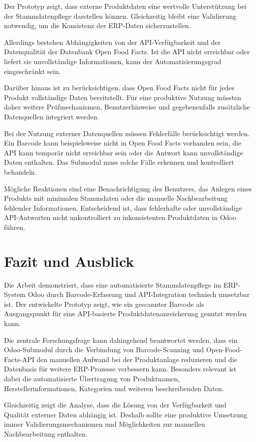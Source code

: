 \documentclass[12pt,a4paper]{article}
\begin{document}
Der Prototyp zeigt, dass externe Produktdaten eine wertvolle Unterstützung bei der Stammdatenpflege darstellen können. Gleichzeitig bleibt eine Validierung notwendig, um die Konsistenz der ERP-Daten sicherzustellen.

Allerdings bestehen Abhängigkeiten von der API-Verfügbarkeit und der Datenqualität der Datenbank Open Food Facts. Ist die API nicht erreichbar oder liefert sie unvollständige Informationen, kann der Automatisierungsgrad eingeschränkt sein.

Darüber hinaus ist zu berücksichtigen, dass Open Food Facts nicht für jedes Produkt vollständige Daten bereitstellt. Für eine produktive Nutzung müssten daher weitere Prüfmechanismen, Benutzerhinweise und gegebenenfalls zusätzliche Datenquellen integriert werden.

Bei der Nutzung externer Datenquellen müssen Fehlerfälle berücksichtigt werden. Ein Barcode kann beispielsweise nicht in Open Food Facts vorhanden sein, die API kann temporär nicht erreichbar sein oder die Antwort kann unvollständige Daten enthalten. Das Submodul muss solche Fälle erkennen und kontrolliert behandeln.

Mögliche Reaktionen sind eine Benachrichtigung des Benutzers, das Anlegen eines Produkts mit minimalen Stammdaten oder die manuelle Nachbearbeitung fehlender Informationen. Entscheidend ist, dass fehlerhafte oder unvollständige API-Antworten nicht unkontrolliert zu inkonsistenten Produktdaten in Odoo führen.

\section{Fazit und Ausblick}

Die Arbeit demonstriert, dass eine automatisierte Stammdatenpflege im ERP-System Odoo durch Barcode-Erfassung und API-Integration technisch umsetzbar ist. Der entwickelte Prototyp zeigt, wie ein gescannter Barcode als Ausgangspunkt für eine API-basierte Produktdatenanreicherung genutzt werden kann.

Die zentrale Forschungsfrage kann dahingehend beantwortet werden, dass ein Odoo-Submodul durch die Verbindung von Barcode-Scanning und Open-Food-Facts-API den manuellen Aufwand bei der Produktanlage reduzieren und die Datenbasis für weitere ERP-Prozesse verbessern kann. Besonders relevant ist dabei die automatisierte Übertragung von Produktnamen, Herstellerinformationen, Kategorien und weiteren beschreibenden Daten.

Gleichzeitig zeigt die Analyse, dass die Lösung von der Verfügbarkeit und Qualität externer Daten abhängig ist. Deshalb sollte eine produktive Umsetzung immer Validierungsmechanismen und Möglichkeiten zur manuellen Nachbearbeitung enthalten.
\end{document}
